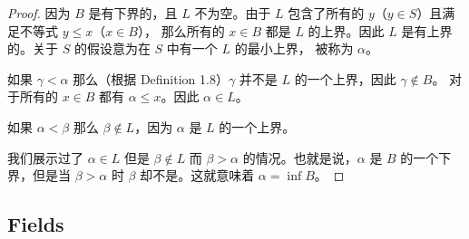 \documentclass[../poma-notes.tex]{subfiles}
\begin{document}
\begin{proof}
  因为 $B$ 是有下界的，且 $L$ 不为空。由于 $L$ 包含了所有的 $y$（$y \in S$）且满足不等式 $y \leq x$（$x \in B$），
  那么所有的 $x \in B$ 都是 $L$ 的上界。因此 $L$ 是有上界的。关于 $S$ 的假设意为在 $S$ 中有一个 $L$ 的最小上界，
  被称为 $\alpha$。

  如果 $\gamma < \alpha$ 那么（根据 Definition 1.8）$\gamma$ 并不是 $L$ 的一个上界，因此 $\gamma \notin B$。
  对于所有的 $x \in B$ 都有 $\alpha \le x$。因此 $\alpha \in L$。

  如果 $\alpha < \beta$ 那么 $\beta \notin L$，因为 $\alpha$ 是 $L$ 的一个上界。

  我们展示过了 $\alpha \in L$ 但是 $\beta \notin L$ 而 $\beta > \alpha$ 的情况。也就是说，$\alpha$
  是 $B$ 的一个下界，但是当 $\beta > \alpha$ 时 $\beta$ 却不是。这就意味着 $\alpha = \inf B$。
\end{proof}

\subsection*{Fields}
\end{document}

